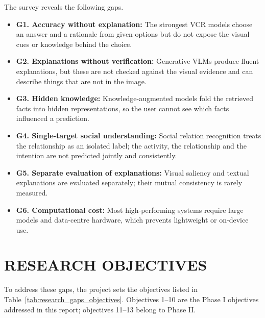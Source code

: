 The survey reveals the following gaps.
\begin{itemize}
\item \textbf{G1. Accuracy without explanation:} The strongest VCR models choose an answer and a rationale from given options but do not expose the visual cues or knowledge behind the choice.
\item \textbf{G2. Explanations without verification:} Generative VLMs produce fluent explanations, but these are not checked against the visual evidence and can describe things that are not in the image.
\item \textbf{G3. Hidden knowledge:} Knowledge-augmented models fold the retrieved facts into hidden representations, so the user cannot see which facts influenced a prediction.
\item \textbf{G4. Single-target social understanding:} Social relation recognition treats the relationship as an isolated label; the activity, the relationship and the intention are not predicted jointly and consistently.
\item \textbf{G5. Separate evaluation of explanations:} Visual saliency and textual explanations are evaluated separately; their mutual consistency is rarely measured.
\item \textbf{G6. Computational cost:} Most high-performing systems require large models and data-centre hardware, which prevents lightweight or on-device use.
\end{itemize}

\section{RESEARCH OBJECTIVES}
\label{sec:objectives}

To address these gaps, the project sets the objectives listed in Table~\ref{tab:research_gaps_objectives}. Objectives 1--10 are the Phase I objectives addressed in this report; objectives 11--13 belong to Phase II.

